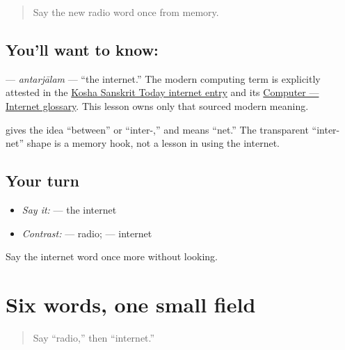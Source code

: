 \label{lesson:SA-C269-antarjalam}



\begin{quote}
Say the new radio word once from memory.
\end{quote}

\subsection*{You'll want to know: }
\textbf{} — \emph{antarjālam} — “the internet.” The modern computing term is explicitly attested in the \href{https://kosha.sanskrit.today/word/en/Internet}{Kosha Sanskrit Today internet entry} and its \href{https://kosha.sanskrit.today/glossary/computer-internet}{Computer — Internet glossary}. This lesson owns only that sourced modern meaning.

\begin{cousinweb}
\textbf{} gives the idea “between” or “inter-,” and \textbf{} means “net.” The transparent “inter-net” shape is a memory hook, not a lesson in using the internet.
\end{cousinweb}

\subsection*{Your turn}
\begin{itemize}
\raggedright
  \item \emph{Say it:} \textbf{} — the internet
  \item \emph{Contrast:} \textbf{} — radio; \textbf{} — internet
\end{itemize}

\begin{tcolorbox}[breakable,colback=teal!4,colframe=teal!35!black,title={Before you move on}]
Say the internet word once more without looking.
\end{tcolorbox}
\section[Practice]{Six words, one small field}

\label{lesson:SA-C269-six-channel-practice}



\begin{quote}
Say “radio,” then “internet.”
\end{quote}

